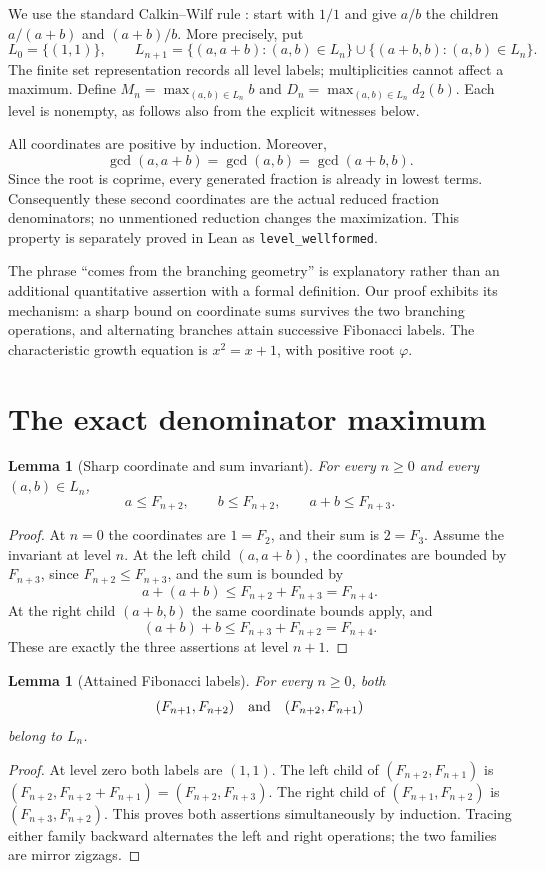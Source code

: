 \documentclass[11pt]{article}
\newtheorem{lemma}[theorem]{Lemma}
\newcommand{\ph}{\varphi}
\begin{document}
We use the standard Calkin--Wilf rule \cite{cw}: start with $1/1$ and give
$a/b$ the children $a/(a+b)$ and $(a+b)/b$. More precisely, put
\[
 L_0=\{(1,1)\},\qquad
 L_{n+1}=\{(a,a+b):(a,b)\in L_n\}
       \cup\{(a+b,b):(a,b)\in L_n\}.
\]
The finite set representation records all level labels; multiplicities cannot
affect a maximum. Define $M_n=\max_{(a,b)\in L_n}b$ and
$D_n=\max_{(a,b)\in L_n}d_2(b)$. Each level is nonempty, as follows also from
the explicit witnesses below.

All coordinates are positive by induction. Moreover,
\[
 \gcd(a,a+b)=\gcd(a,b)=\gcd(a+b,b).
\]
Since the root is coprime, every generated fraction is already in lowest
terms. Consequently these second coordinates are the actual reduced
fraction denominators; no unmentioned reduction changes the maximization.
This property is separately proved in Lean as \texttt{level\_wellformed}.

The phrase ``comes from the branching geometry'' is explanatory rather than
an additional quantitative assertion with a formal definition. Our proof
exhibits its mechanism: a sharp bound on coordinate sums survives the two
branching operations, and alternating branches attain successive Fibonacci
labels. The characteristic growth equation is $x^2=x+1$, with positive
root $\ph$.

\section{The exact denominator maximum}
\begin{lemma}[Sharp coordinate and sum invariant]\label{lem:invariant}
For every $n\ge0$ and every $(a,b)\in L_n$,
\[
 a\le F_{n+2},\qquad b\le F_{n+2},\qquad a+b\le F_{n+3}.
\]
\end{lemma}
\begin{proof}
At $n=0$ the coordinates are $1=F_2$, and their sum is $2=F_3$.
Assume the invariant at level $n$. At the left child $(a,a+b)$,
the coordinates are bounded by $F_{n+3}$, since $F_{n+2}\le F_{n+3}$,
and the sum is bounded by
\[
 a+(a+b)\le F_{n+2}+F_{n+3}=F_{n+4}.
\]
At the right child $(a+b,b)$ the same coordinate bounds apply, and
\[
 (a+b)+b\le F_{n+3}+F_{n+2}=F_{n+4}.
\]
These are exactly the three assertions at level $n+1$.
\end{proof}

\begin{lemma}[Attained Fibonacci labels]\label{lem:witness}
For every $n\ge0$, both
\[
 (F_{n+1},F_{n+2})\quad\hbox{and}\quad(F_{n+2},F_{n+1})
\]
belong to $L_n$.
\end{lemma}
\begin{proof}
At level zero both labels are $(1,1)$. The left child of
$(F_{n+2},F_{n+1})$ is
$(F_{n+2},F_{n+2}+F_{n+1})=(F_{n+2},F_{n+3})$.
The right child of $(F_{n+1},F_{n+2})$ is
$(F_{n+3},F_{n+2})$. This proves both assertions simultaneously by induction.
Tracing either family backward alternates the left and right operations;
the two families are mirror zigzags.
\end{proof}
\end{document}
